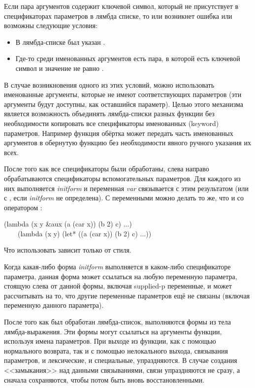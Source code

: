 Если пара аргументов содержит ключевой символ, который не
присутствует в спецификаторах параметров в лямбда списке, то или возникнет
ошибка или возможны следующие условия:
\begin{itemize}
\item
В лямбда-списке был указан .

\item
Где-то среди именованных аргументов есть пара, в которой есть ключевой символ
 и значение не равно {\false}.
\end{itemize}

В случае возникновения одного из этих условий, можно использовать именованные
аргументы, которые не имеют соответствующих параметров (эти аргументы будут
доступны, как оставшийся  параметр). 
Целью этого механизма является возможность объединять лямбда-списки разных
функции без необходимости копировать все спецификаторы именованных (keyword)
параметров. Например функция обёртка может передать часть именованных аргументов
в обернутую функцию без необходимости явного ручного указания их всех. 

После того как все спецификаторы были обработаны, слева направо обрабатываются
спецификаторы вспомогательных параметров. Для каждого из них выполняется
\emph{initform} и переменная \emph{var} связывается с этим результатом (или
с {\false}, если \emph{initform} не определена). С  переменными
можно делать то же, что и со оператором :
\begin{lisp}
(lambda (x y \&aux (a (car x)) (b 2) c) ...) \\
~~~\EQ\ (lambda (x y) (let* ((a (car x)) (b 2) c) ...))
\end{lisp}

Что использовать зависит только от стиля.

Когда какая-либо форма \emph{initform} выполняется в каком-либо спецификаторе
параметра, данная форма может ссылаться на любую переменную параметра, стоящую
слева от данной формы, включая supplied-p переменные, и может рассчитывать на
то, что другие переменные параметров ещё не связаны (включая переменную данного
параметра).

После того как был обработан лямбда-список, выполняются формы из тела
лямбда-выражения. Эти формы могут ссылаться на аргументы функции, используя
имена параметров. При выходе из функции, как с помощью нормального возврата, так
и с помощью нелокального выхода, связывания параметров, и лексические, и
специальные, упраздняются. В случае создания <<замыкания>> над данными
связываниями, связи упраздняются не сразу, а сначала сохраняются, чтобы потом
быть вновь восстановленными. 

